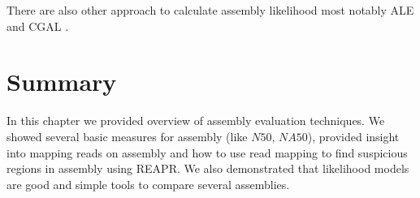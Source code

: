 There are also other approach to calculate assembly likelihood
most notably ALE and CGAL \citep{ALE, CGAL}.

\section{Summary}

In this chapter we provided overview of assembly evaluation techniques.
We showed several basic measures for assembly (like $N50$, $NA50$),
provided insight into mapping reads on assembly and how to use
read mapping to find suspicious regions in assembly using REAPR.
We also demonstrated that likelihood models are good and simple
tools to compare several assemblies.

